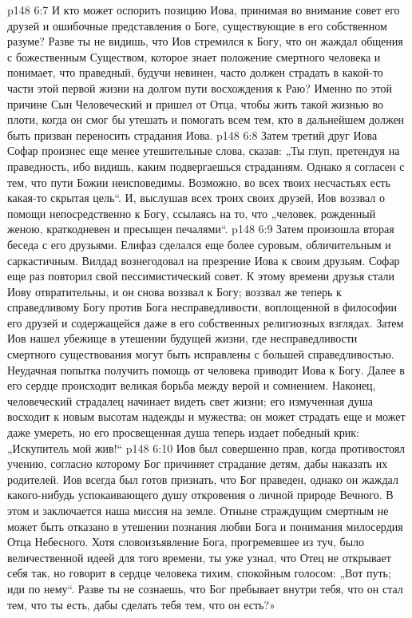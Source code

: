 \vs p148 6:7 И кто может оспорить позицию Иова, принимая во внимание совет его друзей и ошибочные представления о Боге, существующие в его собственном разуме? Разве ты не видишь, что Иов стремился к  Богу, что он жаждал общения с божественным Существом, которое знает положение смертного человека и понимает, что праведный, будучи невинен, часто должен страдать в какой\hyp{}то части этой первой жизни на долгом пути восхождения к Раю? Именно по этой причине Сын Человеческий и пришел от Отца, чтобы жить такой жизнью во плоти, когда он смог бы утешать и помогать всем тем, кто в дальнейшем должен быть призван переносить страдания Иова.
\vs p148 6:8 Затем третий друг Иова Софар произнес еще менее утешительные слова, сказав: „Ты глуп, претендуя на праведность, ибо видишь, каким подвергаешься страданиям. Однако я согласен с тем, что пути Божии неисповедимы. Возможно, во всех твоих несчастьях есть какая\hyp{}то скрытая цель“. И, выслушав всех троих своих друзей, Иов воззвал о помощи непосредственно к Богу, ссылаясь на то, что „человек, рожденный женою, краткодневен и пресыщен печалями“.
\vs p148 6:9 Затем произошла вторая беседа с его друзьями. Елифаз сделался еще более суровым, обличительным и саркастичным. Вилдад вознегодовал на презрение Иова к своим друзьям. Софар еще раз повторил свой пессимистический совет. К этому времени друзья стали Иову отвратительны, и он снова воззвал к Богу; воззвал же теперь к справедливому Богу против Бога несправедливости, воплощенной в философии его друзей и содержащейся даже в его собственных религиозных взглядах. Затем Иов нашел убежище в утешении будущей жизни, где несправедливости смертного существования могут быть исправлены с большей справедливостью. Неудачная попытка получить помощь от человека приводит Иова к Богу. Далее в его сердце происходит великая борьба между верой и сомнением. Наконец, человеческий страдалец начинает видеть свет жизни; его измученная душа восходит к новым высотам надежды и мужества; он может страдать еще и может даже умереть, но его просвещенная душа теперь издает победный крик: „Искупитель мой жив!“
\vs p148 6:10 Иов был совершенно прав, когда противостоял учению, согласно которому Бог причиняет страдание детям, дабы наказать их родителей. Иов всегда был готов признать, что Бог праведен, однако он жаждал какого\hyp{}нибудь успокаивающего душу откровения о личной природе Вечного. В этом и заключается наша миссия на земле. Отныне страждущим смертным не может быть отказано в утешении познания любви Бога и понимания милосердия Отца Небесного. Хотя словоизъявление Бога, прогремевшее из туч, было величественной идеей для того времени, ты уже узнал, что Отец не открывает себя так, но говорит в сердце человека тихим, спокойным голосом: „Вот путь; иди по нему“. Разве ты не сознаешь, что Бог пребывает внутри тебя, что он стал тем, что ты есть, дабы сделать тебя тем, что он есть?»

